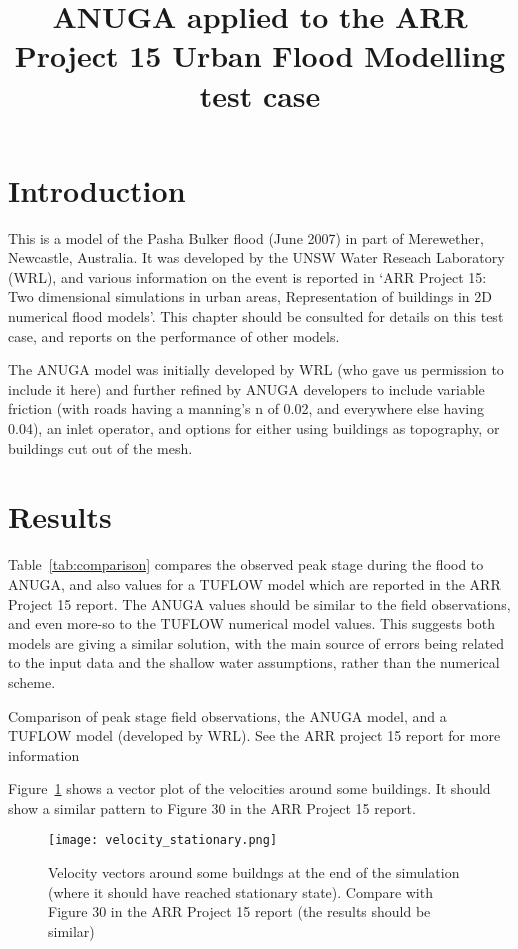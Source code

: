 \documentclass{article}
\begin{document}
\title{ANUGA applied to the ARR Project 15 Urban Flood Modelling test case}

\maketitle

\section{Introduction}
This is a model of the Pasha Bulker flood (June 2007) in part of Merewether,
Newcastle, Australia. It was developed by the UNSW Water Reseach Laboratory (WRL),
and various information on the event is reported in `ARR Project 15: Two
dimensional simulations in urban areas, Representation of buildings in 2D
numerical flood models'. This chapter should be consulted for details on this
test case, and reports on the performance of other models. 

The ANUGA model was initially developed by WRL (who gave us permission to
include it here) and further refined by ANUGA developers to include variable
friction (with roads having a manning's n of 0.02, and everywhere else having
0.04), an inlet operator, and options for either using buildings as topography, or
buildings cut out of the mesh.

\section{Results}
Table~\ref{tab:comparison} compares the observed peak stage during the flood to
ANUGA, and also values for a TUFLOW model which are reported in the ARR Project
15 report. The ANUGA values should be similar to the field observations, and
even more-so to the TUFLOW numerical model values. This suggests both models
are giving a similar solution, with the main source of errors being related to
the input data and the shallow water assumptions, rather than the numerical
scheme.

\begin{table}
\caption{Comparison of peak stage field observations, the ANUGA model, and a
TUFLOW model (developed by WRL). See the ARR project 15 report for more
information}
\label{tab:comparison}
\end{table}

Figure~\ref{fig:stationary_vel} shows a vector plot of the velocities around some buildings. It should
show a similar pattern to Figure 30 in the ARR Project 15 report.
\begin{figure}
\texttt{[image: velocity\_stationary.png]}
\caption{Velocity vectors around some buildngs at the end of the simulation
(where it should have reached stationary state). Compare with Figure 30 in the ARR Project 15 report (the results should be similar)}
\label{fig:stationary_vel}
\end{figure}
\end{document}
